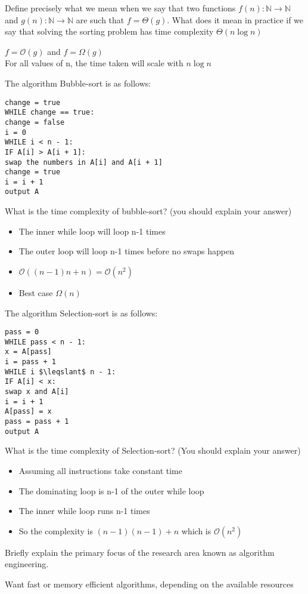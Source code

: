 \documentclass[addpoints]{exam}
\begin{document}
\begin{questions}
\question[4]Define precisely what we mean when we say that two functions $f(n):\mathbb{N}\rightarrow\mathbb{N}$ and $g(n):\mathbb{N}\rightarrow\mathbb{N}$ are such that $f=\Theta(g)$. What does it mean in practice if we say that solving the sorting problem has time complexity $\Theta(n\log n)$
\begin{solution}[2in]
	$f=\mathcal{O}(g)$ and $f=\Omega(g)$\\
	For all values of n, the time taken will scale with $n\log n$
\end{solution}

\question[5]The algorithm Bubble-sort is as follows:
\begin{lstlisting}
change = true
WHILE change == true:
change = false
i = 0
WHILE i < n - 1:
IF A[i] > A[i + 1]:
swap the numbers in A[i] and A[i + 1]
change = true
i = i + 1
output A
\end{lstlisting}
What is the time complexity of bubble-sort? (you should explain your answer)
\begin{solution}[2in]
	\begin{itemize}
		\item The inner while loop will loop n-1 times
		\item The outer loop will loop n-1 times before no swaps happen
		\item $\mathcal{O}((n-1)n+n)=\mathcal{O}(n^2)$
		\item Best case $\Omega(n)$
	\end{itemize}
\end{solution}

\question[6]The algorithm Selection-sort is as follows:
\begin{lstlisting}
pass = 0
WHILE pass < n - 1:
x = A[pass]
i = pass + 1
WHILE i $\leqslant$ n - 1:
IF A[i] < x:
swap x and A[i]
i = i + 1
A[pass] = x
pass = pass + 1
output A
\end{lstlisting}
What is the time complexity of Selection-sort? (You should explain your answer)
\begin{solution}[2in]
	\begin{itemize}
		\item Assuming all instructions take constant time
		\item The dominating loop is n-1 of the outer while loop
		\item The inner while loop runs n-1 times
		\item So the complexity is $(n-1)(n-1)+n$ which is $\mathcal{O}(n^2)$
	\end{itemize}
\end{solution}

\question[2]Briefly explain the primary focus of the research area known as algorithm engineering.
\begin{solution}[2in]
	Want fast or memory efficient algorithms, depending on the available resources
\end{solution}



\end{questions}

	
	
	
	
\end{document}
